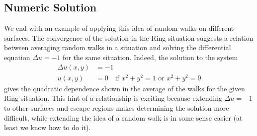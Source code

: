 \documentclass[12pt]{article}
\begin{document}
	\subsection{Numeric Solution} \label{NumericSoln}
		We end with an example of applying this idea of random walks on different surfaces.
		The convergence of the solution in the Ring situation suggests a relation between averaging random walks in a situation and solving the differential equation $\Delta u = -1$ for the same situation.
		Indeed, the solution to the system
		\begin{equation*} \begin{split} 
			\Delta u(x,y) & = -1 \\
			u(x,y) & = 0 \quad\text{if } x^2+y^2 = 1 \text{ or } x^2+y^2 = 9
		\end{split} \end{equation*}
		gives the quadratic dependence shown in the average of the walks for the given Ring situation.
		This hint of a relationship is exciting because extending $\Delta u = -1$ to other surfaces and escape regions makes determining the solution more difficult, while extending the idea of a random walk is in some sense easier (at least we know how to do it).

\pagebreak


\end{document}

